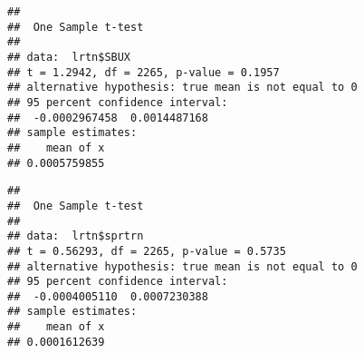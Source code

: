 \documentclass[
]{article}
\newenvironment{Shaded}{\begin{snugshade}}{\end{snugshade}}
\newcommand{\AttributeTok}[1]{\textcolor[rgb]{0.13,0.29,0.53}{#1}}
\newcommand{\CommentTok}[1]{\textcolor[rgb]{0.56,0.35,0.01}{\textit{#1}}}
\newcommand{\DecValTok}[1]{\textcolor[rgb]{0.00,0.00,0.81}{#1}}
\newcommand{\DocumentationTok}[1]{\textcolor[rgb]{0.56,0.35,0.01}{\textbf{\textit{#1}}}}
\newcommand{\FunctionTok}[1]{\textcolor[rgb]{0.13,0.29,0.53}{\textbf{#1}}}
\newcommand{\NormalTok}[1]{#1}
\newcommand{\OtherTok}[1]{\textcolor[rgb]{0.56,0.35,0.01}{#1}}
\newcommand{\SpecialCharTok}[1]{\textcolor[rgb]{0.81,0.36,0.00}{\textbf{#1}}}
\newcommand{\StringTok}[1]{\textcolor[rgb]{0.31,0.60,0.02}{#1}}
\begin{document}
\begin{Shaded}
\end{Shaded}

\begin{verbatim}
## 
##  One Sample t-test
## 
## data:  lrtn$SBUX
## t = 1.2942, df = 2265, p-value = 0.1957
## alternative hypothesis: true mean is not equal to 0
## 95 percent confidence interval:
##  -0.0002967458  0.0014487168
## sample estimates:
##    mean of x 
## 0.0005759855
\end{verbatim}

\begin{Shaded}
\end{Shaded}

\begin{verbatim}
## 
##  One Sample t-test
## 
## data:  lrtn$sprtrn
## t = 0.56293, df = 2265, p-value = 0.5735
## alternative hypothesis: true mean is not equal to 0
## 95 percent confidence interval:
##  -0.0004005110  0.0007230388
## sample estimates:
##    mean of x 
## 0.0001612639
\end{verbatim}

\begin{Shaded}
\end{Shaded}
\end{document}
